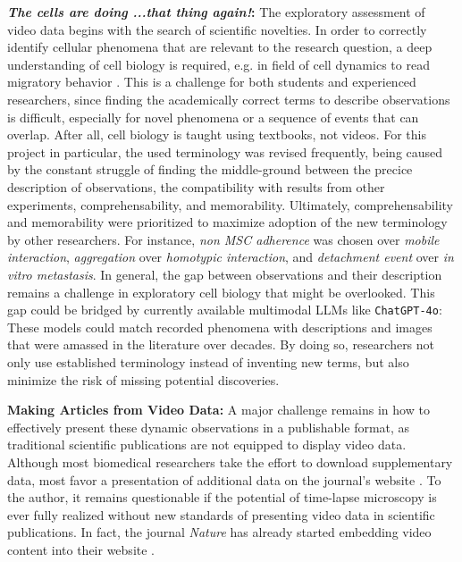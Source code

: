\textbf{\textit{The cells are doing ...that thing again!}:} The exploratory
assessment of video data begins with the search of scientific novelties. In
order to correctly identify cellular phenomena that are relevant to the research
question, a deep understanding of cell biology is required, e.g. in field of
cell dynamics to read migratory behavior
\cite{nalbantExploratoryCellDynamics2018}. This is a challenge for both students
and experienced researchers, since finding the academically correct terms to
describe observations is difficult, especially for novel phenomena or a sequence
of events that can overlap. After all, cell biology is taught using textbooks,
not videos. For this project in particular, the used terminology was revised
frequently, being caused by the constant struggle of finding the middle-ground
between the precice description of observations, the compatibility with results
from other experiments, comprehensability, and memorability. Ultimately,
comprehensability and memorability were prioritized to maximize adoption of the
new terminology by other researchers. For instance, \emph{non MSC adherence} was
chosen over \emph{mobile interaction}, \emph{aggregation} over
\emph{homotypic interaction}, and \emph{detachment event} over \emph{in vitro
metastasis}. In general, the gap between observations and their description
remains a challenge in exploratory cell biology that might be overlooked. This
gap could be bridged by currently available multimodal \acp{LLM} like
\texttt{ChatGPT-4o}: These models could match recorded phenomena with
descriptions and images that were amassed in the literature over decades. By
doing so, researchers not only use established terminology instead of inventing
new terms, but also minimize the risk of missing potential discoveries.



\textbf{Making Articles from Video Data:} A major challenge remains in how to
effectively present these dynamic observations in a publishable format, as
traditional scientific publications are not equipped to display video data.
Although most biomedical researchers take the effort to download supplementary
data, most favor a presentation of additional data on the journal's website
\cite{priceRoleSupplementaryMaterial2018}. To the author, it remains
questionable if the potential of time-lapse microscopy is ever fully realized
without new standards of presenting video data in scientific publications. 
In fact, the journal \emph{Nature} has already started embedding
video content into their website \cite{NatureVideoContent}. 

